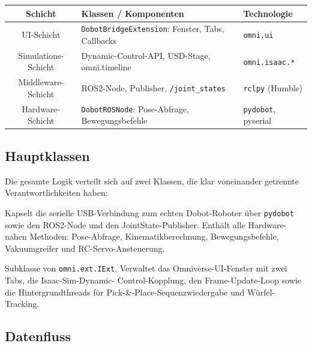 \documentclass[11pt,a4paper]{article}
\begin{document}
\begin{center}
\renewcommand{\arraystretch}{1.4}
\begin{tabular}{|c|l|l|}
  \hline
  \textbf{Schicht} & \textbf{Klassen / Komponenten} & \textbf{Technologie} \\
  \hline
  UI-Schicht & \texttt{DobotBridgeExtension}: Fenster, Tabs,
               Callbacks & \texttt{omni.ui} \\
  \hline
  Simulations-Schicht & Dynamic-Control-API, USD-Stage,
                        omni.timeline & \texttt{omni.isaac.*} \\
  \hline
  Middleware-Schicht & ROS2-Node, Publisher,
                       \texttt{/joint\_states} & \texttt{rclpy} (Humble) \\
  \hline
  Hardware-Schicht & \texttt{DobotROSNode}: Pose-Abfrage,
                     Bewegungsbefehle & \texttt{pydobot}, pyserial \\
  \hline
\end{tabular}
\end{center}

\subsection{Hauptklassen}

Die gesamte Logik verteilt sich auf zwei Klassen, die klar
voneinander getrennte Verantwortlichkeiten haben:

\begin{description}[leftmargin=4.5cm, style=nextline]
  \item[\texttt{DobotROSNode}]
    Kapselt die serielle USB-Verbindung zum echten Dobot-Roboter
    über \texttt{pydobot} sowie den ROS2-Node und den
    JointState-Publisher. Enthält alle Hardware-nahen Methoden:
    Pose-Abfrage, Kinematikberechnung, Bewegungsbefehle,
    Vakuumgreifer und RC-Servo-Ansteuerung.

  \item[\texttt{DobotBridgeExtension}]
    Subklasse von \texttt{omni.ext.IExt}. Verwaltet das
    Omniverse-UI-Fenster mit zwei Tabs, die Isaac-Sim-Dynamic-%
    Control-Kopplung, den Frame-Update-Loop sowie die
    Hintergrundthreads für Pick-\&-Place-Sequenzwiedergabe
    und Würfel-Tracking.
\end{description}

\subsection{Datenfluss}
\end{document}

